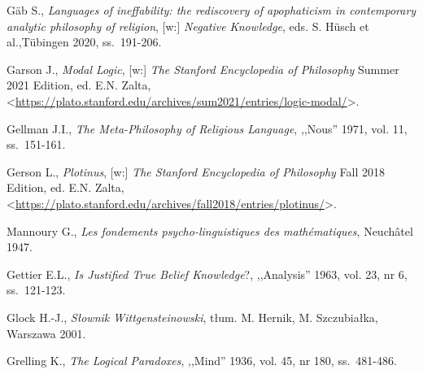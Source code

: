 \begin{thebibliography}{100}
Gäb S., \textit{Languages of ineffability: the rediscovery of apophaticism in contemporary analytic philosophy of religion},
[w:] \textit{Negative Knowledge}, eds. S. Hüsch et al.,Tübingen 2020, ss.~191-206.

Garson J., \textit{Modal Logic}, [w:] \textit{The Stanford Encyclopedia of Philosophy}
Summer 2021 Edition, ed. E.N. Zalta, {\textless}\url{https://plato.stanford.edu/archives/sum2021/entries/logic-modal/}{\textgreater}.


Gellman J.I., \textit{The Meta-Philosophy of Religious Language}, ,,Nous'' 1971, vol. 11, ss.~151-161.

Gerson L., \textit{Plotinus}, [w:] \textit{The Stanford Encyclopedia of Philosophy}
Fall 2018 Edition, ed. E.N. Zalta, {\textless}\url{https://plato.stanford.edu/archives/fall2018/entries/plotinus/}{\textgreater}.

Mannoury G., \textit{Les fondements psycho-linguistiques des mathématiques}, Neuchâtel 1947.

Gettier E.L., \textit{Is Justified True Belief Knowledge}?, ,,Analysis'' 1963, vol. 23, nr 6, ss.~121-123.


Glock H.-J., \textit{Słownik Wittgensteinowski}, tłum. M. Hernik, M. Szczubiałka, Warszawa 2001.


Grelling K., \textit{The Logical Paradoxes}, ,,Mind'' 1936, vol. 45, nr 180, ss.~481-486.


\end{thebibliography}
